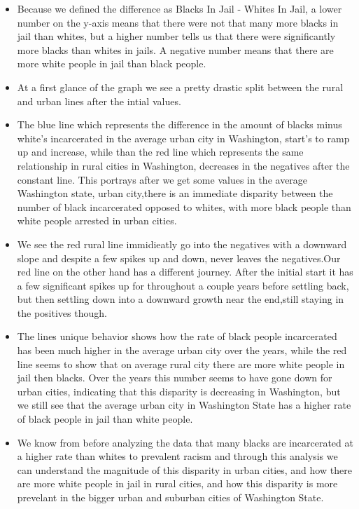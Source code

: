\documentclass[
]{article}
\begin{document}
\begin{itemize}
\item
  Because we defined the difference as Blacks In Jail - Whites In Jail,
  a lower number on the y-axis means that there were not that many more
  blacks in jail than whites, but a higher number tells us that there
  were significantly more blacks than whites in jails. A negative number
  means that there are more white people in jail than black people.
\item
  At a first glance of the graph we see a pretty drastic split between
  the {rural} and {urban} lines after the intial values.
\item
  The blue line which represents the difference in the amount of blacks
  minus white's incarcerated in the average urban city in Washington,
  start's to ramp up and increase, while than the red line which
  represents the same relationship in rural cities in Washington,
  decreases in the negatives after the constant line. This portrays
  after we get some values in the average Washington state, urban
  city,there is an immediate disparity between the number of black
  incarcerated opposed to whites, with more black people than white
  people arrested in urban cities.
\item
  We see the red rural line immidieatly go into the negatives with a
  downward slope and despite a few spikes up and down, never leaves the
  negatives.Our red line on the other hand has a different journey.
  After the initial start it has a few significant spikes up for
  throughout a couple years before settling back, but then settling down
  into a downward growth near the end,still staying in the positives
  though.
\item
  The lines unique behavior shows how the rate of black people
  incarcerated has been much higher in the average urban city over the
  years, while the red line seems to show that on average rural city
  there are more white people in jail then blacks. Over the years this
  number seems to have gone down for urban cities, indicating that this
  disparity is decreasing in Washington, but we still see that the
  average urban city in Washington State has a higher rate of black
  people in jail than white people.
\item
  We know from before analyzing the data that many blacks are
  incarcerated at a higher rate than whites to prevalent racism and
  through this analysis we can understand the magnitude of this
  disparity in urban cities, and how there are more white people in jail
  in rural cities, and how this disparity is more prevelant in the
  bigger urban and suburban cities of Washington State.
\end{itemize}
\end{document}
